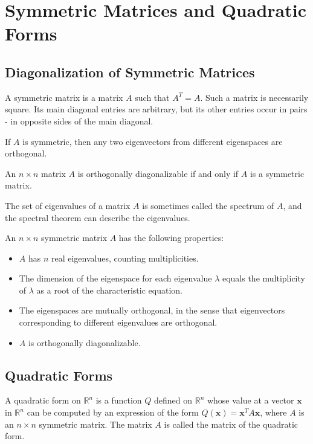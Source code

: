 \documentclass[../linalg.tex]{subfiles}
\begin{document}
\chapter{Symmetric Matrices and Quadratic Forms}
\section{Diagonalization of Symmetric Matrices}
A symmetric matrix is a matrix $A$ such that $A^T=A$. Such a matrix is necessarily square. Its main diagonal entries are arbitrary, but its other entries occur in pairs - in opposite sides of the main diagonal.

\begin{theorem}
    If $A$ is symmetric, then any two eigenvectors from different eigenspaces are orthogonal.
\end{theorem}

\begin{theorem}
    An $n\times n$ matrix $A$ is orthogonally diagonalizable if and only if $A$ is a symmetric matrix.
\end{theorem}

The set of eigenvalues of a matrix $A$ is sometimes called the spectrum of $A$, and the spectral theorem can describe the eigenvalues.
\begin{theorem}
    An $n\times n$ symmetric matrix $A$ has the following properties:
    \begin{itemize}
        \item $A$ has $n$ real eigenvalues, counting multiplicities.
        \item The dimension of the eigenspace for each eigenvalue $\lambda$ equals the multiplicity of $\lambda$ as a root of the characteristic equation.
        \item The eigenspaces are mutually orthogonal, in the sense that eigenvectors corresponding to different eigenvalues are orthogonal.
        \item $A$ is orthogonally diagonalizable.
    \end{itemize}
\end{theorem}



\section{Quadratic Forms}
A quadratic form on $\mathbb{R}^n$ is a function $Q$ defined on $\mathbb{R}^n$ whose value at a vector $\textbf{x}$ in $\mathbb{R}^n$ can be computed by an expression of the form 
$Q(\textbf{x})=\textbf{x}^TA\textbf{x}$, where $A$ is an $n\times n$ symmetric matrix. The matrix $A$ is called the matrix of the quadratic form.
\end{document}
